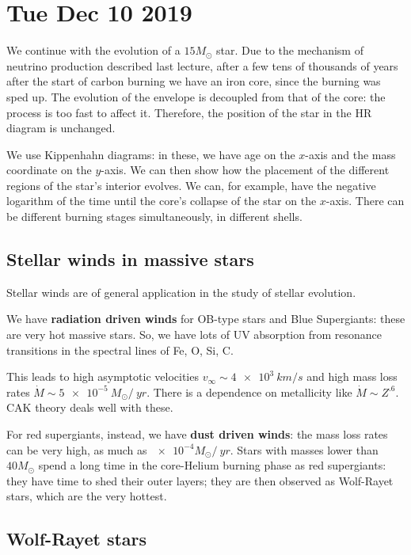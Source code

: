 \documentclass[main.tex]{subfiles}
\begin{document}
\section*{Tue Dec 10 2019}

We continue with the evolution of a \(15 M_{\odot}\) star. 
Due to the mechanism of neutrino production described last lecture, after a few tens of thousands of years after the start of carbon burning we have an iron core, since the burning was sped up.
The evolution of the envelope is decoupled from that of the core: the process is too fast to affect it. Therefore, the position of the star in the HR diagram is unchanged.

We use Kippenhahn diagrams: in these, we have age on the \(x\)-axis and the mass coordinate on the \(y\)-axis. We can then show how the placement of the different regions of the star's interior evolves.
We can, for example, have the negative logarithm of the time until the core's collapse of the star on the \(x\)-axis.
There can be different burning stages simultaneously, in different shells. 

\subsection{Stellar winds in massive stars}

Stellar winds are of general application in the study of stellar evolution. 

We have \textbf{radiation driven winds} for OB-type stars and Blue Supergiants: these are very hot massive stars.
So, we have lots of UV absorption from resonance transitions in the spectral lines of Fe, O, Si, C.

This leads to high asymptotic velocities \(v_{ \infty } \sim \SI{4e3}{km/s}\) and high mass loss rates \(\dot{M} \sim \SI{5e-5}{} M_{\odot} / \SI{}{yr}\). 
There is a dependence on metallicity like \(\dot{M} \sim Z^{\num{.6}}\).
CAK theory deals well with these.

For red supergiants, instead, we have 
\textbf{dust driven winds}: the mass loss rates can be very high, as much as \(\num{e-4} M_{\odot} / \SI{}{yr}\).
Stars with masses lower than \(40 M_{\odot}\) spend a long time in the core-Helium burning phase as red supergiants: they have time to shed their outer layers; they are then observed as Wolf-Rayet stars, which are the very hottest.

\subsection{Wolf-Rayet stars}
\end{document}
